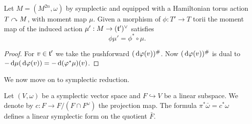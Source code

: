 \begin{lem}
    Let $M=(M^{2n},\omega)$ by symplectic and equipped with a Hamiltonian torus action $T\curvearrowright M$, with moment map $\mu$.
    Given a morphism of $\phi:T'\to T$ torii the moment map of the induced action $\mu':M\to(\mathfrak{t}')^\vee$ satisfies
    \[\phi\mu'=\phi^*\circ\mu.\]
\end{lem}
\begin{proof}
    For $v\in\mathfrak{t}'$ we take the pushforward $(\,\mathrm d\varphi(v))^\#$.
    Now $(\,\mathrm d\varphi(v))^\#$ is dual to $-\,\mathrm d\mu(\,\mathrm d\varphi(v))=-\,\mathrm d(\varphi^*\mu)(v)$.
\end{proof}

We now move on to symplectic reduction.

\begin{lem}
    Let $(V,\omega)$ be a symplectic vector space and $F\hookrightarrow V$ be a linear subspace.
    We denote by $c:F\to F/(F\cap F^\omega)$ the projection map.
    The formula $\pi^*\bar\omega=c^*\omega$ defines a linear symplectic form on the quotient $\bar F$.
\end{lem}